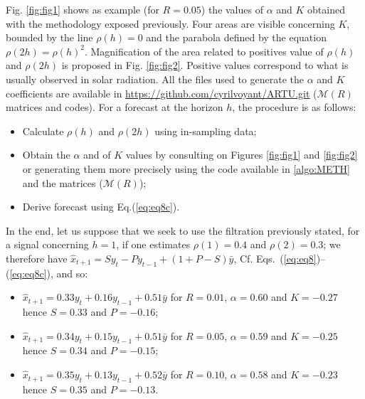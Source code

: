 Fig. \ref{fig:fig1} shows as example (for $R=0.05$) the values of $\alpha$ and $K$ obtained with the methodology exposed previously. Four areas are visible concerning $K$, bounded by the line $\rho(h)=0$ and the parabola defined by the equation $\rho(2h)=\rho(h)^2$. Magnification of the area related to positives value of $\rho(h)$ and $\rho(2h)$ is proposed in Fig. \ref{fig:fig2}. Positive values correspond to what is usually observed in solar radiation. All the files used to generate the $ \alpha $ and $ K $ coefficients are available in \url{https://github.com/cyrilvoyant/ARTU.git} ($\mathcal{M}(R)$ matrices and codes). 
For a forecast at the horizon $h$, the procedure is as follows:
\begin{itemize}[label=$\looparrowright$]  
\item Calculate $ \rho (h) $ and $ \rho (2h) $ using in-sampling data;
\item Obtain the $ \alpha $ and of $ K $ values by consulting on Figures \ref {fig:fig1} and \ref {fig:fig2} or generating them more precisely using the code available in \ref{algo:METH} and the matrices ($\mathcal{M}(R)$); 
\item Derive forecast using Eq.(\ref {eq:eq8c}). 
\end{itemize}
In the end, let us suppose that we seek to use the filtration previously stated, for a signal concerning $h = 1$, if one estimates $ \rho (1) = 0.4 $ and $ \rho (2) = 0.3 $; we therefore have $\widehat{x}_{t+1}=S{y}_t-Py_{t-1}+(1+P-S)\bar{y}$, Cf. Eqs.~(\ref{eq:eq8})--(\ref{eq:eq8c}), and so:


 \begin{itemize}[label=$\looparrowright$]  
\item $\widehat{x}_{t+1}=0.33y_t+0.16y_{t-1}+0.51\bar{y}$ for $R=0.01$, $\alpha=0.60$ and $K=-0.27$ hence $S=0.33$ and $P=-0.16$;
\item $\widehat{x}_{t+1}=0.34y_t+0.15y_{t-1}+0.51\bar{y}$ for $R=0.05$, $\alpha=0.59$ and $K=-0.25$ hence $S=0.34$ and $P=-0.15$;
\item $\widehat{x}_{t+1}=0.35y_t+0.13y_{t-1}+0.52\bar{y}$ for $R=0.10$, $\alpha=0.58$ and $K=-0.23$ hence $S=0.35$ and $P=-0.13$.
\end{itemize} 



